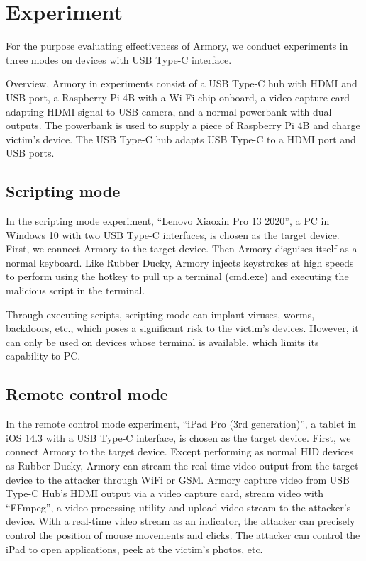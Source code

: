 \section{Experiment}
\label{sec:experiment}


For the purpose evaluating effectiveness of Armory, we conduct experiments in three modes on devices with USB Type-C interface. 

Overview, Armory in experiments consist of a USB Type-C hub with HDMI and USB port,
a Raspberry Pi 4B with a Wi-Fi chip onboard,
a video capture card adapting HDMI signal to USB camera,
and a normal powerbank with dual outputs.
The powerbank is used to supply a piece of Raspberry Pi 4B and charge victim's device.
The USB Type-C hub adapts USB Type-C to a HDMI port and USB ports.


\subsection{Scripting mode}

In the scripting mode experiment, ``Lenovo Xiaoxin Pro 13 2020'', a PC in Windows 10 with two USB Type-C interfaces, is chosen as the target device. First, we connect Armory to the target device. Then Armory disguises itself as a normal keyboard. Like Rubber Ducky, Armory injects keystrokes at high speeds to perform using the hotkey to pull up a terminal (cmd.exe) and executing the malicious script in the terminal. 

Through executing scripts, scripting mode can implant viruses, worms, backdoors, etc., which poses a significant risk to the victim's devices. 
However, it can only be used on devices whose terminal is available, which limits its capability to PC. 

\subsection{Remote control mode}

In the remote control mode experiment, ``iPad Pro (3rd generation)'', a tablet in iOS 14.3 with a USB Type-C interface, is chosen as the target device. First, we connect Armory to the target device. 
Except performing as normal HID devices as Rubber Ducky, Armory can stream the real-time video output from the target device to the attacker through WiFi or GSM. 
Armory capture video from USB Type-C Hub's HDMI output via a video capture card, stream video with ``FFmpeg'', a video processing utility and upload video stream to the attacker's device.    
With a real-time video stream as an indicator, the attacker can precisely control the position of mouse movements and clicks. The attacker can control the iPad to open applications, peek at the victim's photos, etc.

